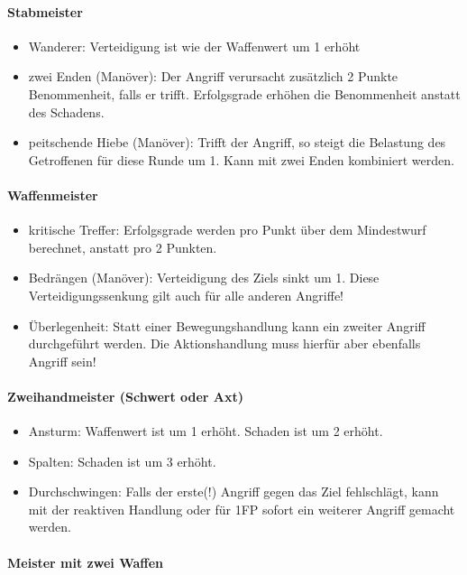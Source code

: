 \documentclass{article}
\begin{document}
\paragraph{Stabmeister}

\begin{itemize}
\item Wanderer: Verteidigung ist wie der Waffenwert um 1 erhöht
\item zwei Enden (Manöver): Der Angriff verursacht zusätzlich 2 Punkte Benommenheit, falls er trifft. Erfolgsgrade erhöhen die Benommenheit anstatt des Schadens.
\item peitschende Hiebe (Manöver): Trifft der Angriff, so steigt die Belastung des Getroffenen für diese Runde um 1. Kann mit zwei Enden kombiniert werden.
\end{itemize}

\paragraph{Waffenmeister}

\begin{itemize}
\item kritische Treffer: Erfolgsgrade werden pro Punkt über dem Mindestwurf berechnet, anstatt pro 2 Punkten.
\item Bedrängen (Manöver): Verteidigung des Ziels sinkt um 1. Diese Verteidigungssenkung gilt auch für alle anderen Angriffe!
\item Überlegenheit: Statt einer Bewegungshandlung kann ein zweiter Angriff durchgeführt werden. Die Aktionshandlung muss hierfür aber ebenfalls Angriff sein!
\end{itemize}

\paragraph{Zweihandmeister (Schwert oder Axt)}

\begin{itemize}
\item Ansturm: Waffenwert ist um 1 erhöht. Schaden ist um 2 erhöht.
\item Spalten: Schaden ist um 3 erhöht.
\item Durchschwingen: Falls der erste(!) Angriff gegen das Ziel fehlschlägt, kann mit der reaktiven Handlung oder für 1FP sofort ein weiterer Angriff gemacht werden.
\end{itemize}

\paragraph{Meister mit zwei Waffen}
\end{document}
